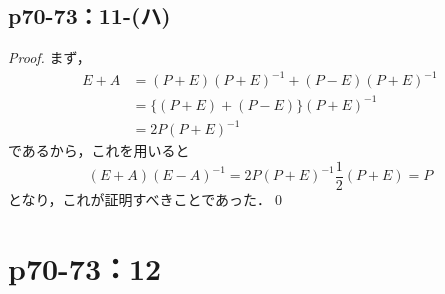 \documentclass[a4paper,10pt,fleqn]{ltjsarticle}
\begin{document}
\subsection*{p70-73：11-(ハ)}

\begin{tleftbar}
    \begin{proof}
        まず，
        \begin{align*}
            E+A & =(P+E)(P+E)^{-1}+(P-E) (P+E)^{-1} \\
                & = \{ (P+E)+(P-E) \} (P+E)^{-1}    \\
                & = 2P (P+E)^{-1}
        \end{align*}
        であるから，これを用いると
        \[
            (E+A)(E-A)^{-1} = 2P (P+E)^{-1} \frac{1}{2} (P+E) =P
        \]
        となり，これが証明すべきことであった．\qed
    \end{proof}
\end{tleftbar}

\newpage
\section*{p70-73：12}
\end{document}
